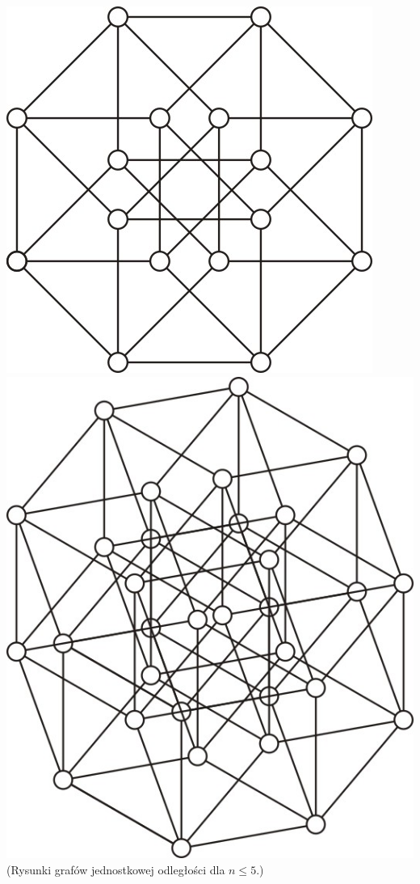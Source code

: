 \documentclass{pracamgr}
\begin{document}
   \includegraphics[scale=1]{img/unitary_4.jpg}
   \includegraphics[scale=1]{img/unitary_5_1.jpg}\newline
   (Rysunki grafów jednostkowej odległości dla $n\le 5$.)
   
\end{document}
